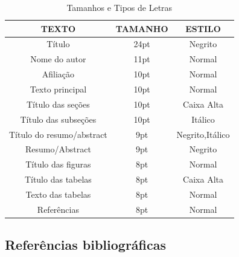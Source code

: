 \begin{table}[h]
\centering
\caption{Tamanhos e Tipos de Letras}
\label{tab:tabela1}
\begin{adjustbox}{max width=\textwidth}
\begin{tabular}{|c|c|c|}
\hline
TEXTO & TAMANHO & ESTILO \\ \hline\hline
Título                      & 24pt                         & Negrito                     \\
Nome do autor               & 11pt                         & Normal                      \\
Afiliação                   & 10pt                         & Normal                      \\
Texto principal             & 10pt                         & Normal                      \\
Título das seções           & 10pt                         & Caixa Alta                  \\
Título das subseções        & 10pt                         & Itálico                     \\
Título do resumo/abstract   & 9pt                          & Negrito,Itálico             \\
Resumo/Abstract             & 9pt                          & Negrito                     \\
Título das figuras          & 8pt                          & Normal                      \\
Título das tabelas          & 8pt                          & Caixa Alta                  \\
Texto das tabelas           & 8pt                          & Normal                      \\
Referências                 & 8pt                          & Normal                      \\ \hline
\end{tabular}
\end{adjustbox}
\end{table}



\subsection{Referências bibliográficas}

